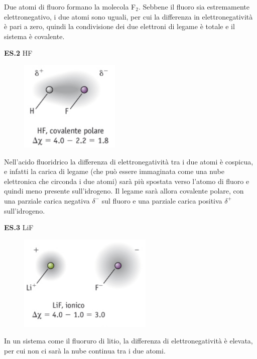 \vspace{-0.7cm}Due atomi di fluoro formano la molecola F$_2$. Sebbene il fluoro sia estremamente elettronegativo, i due atomi sono uguali, per cui la differenza in elettronegatività è pari a zero, quindi la condivisione dei due elettroni di legame è totale e il sistema è covalente.

\vspace{0.2cm}\textbf{ES.2} HF

\vspace{-0.3cm}\begin{figure}[H]
    \centering
    \includegraphics[width=4.8cm]{immagini/HF.png}
\end{figure}

\vspace{-0.4cm}Nell'acido fluoridrico la differenza di elettronegatività tra i due atomi è cospicua, e infatti la carica di legame (che può essere immaginata come una nube elettronica che circonda i due atomi) sarà più spostata verso l'atomo di fluoro e quindi meno presente sull'idrogeno. Il legame sarà allora covalente polare, con una parziale carica negativa $\delta^-$ sul fluoro e una parziale carica positiva $\delta^+$ sull'idrogeno. 

\vspace{0.2cm}\textbf{ES.3} LiF

\vspace{-0.3cm}\begin{figure}[H]
    \centering
    \includegraphics[width=6.4cm]{immagini/LiF.png}
\end{figure}

\vspace{-0.8cm}In un sistema come il fluoruro di litio, la differenza di elettronegatività è elevata, per cui non ci sarà la nube continua tra i due atomi.

